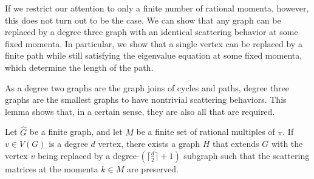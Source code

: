 \documentclass[../thesis-main/thesis-main]{subfiles}
\begin{document}
If we restrict our attention to only a finite number of rational momenta, however, this does not turn out to be the case.  We can show that any graph can be replaced by a degree three graph with an identical scattering behavior at some fixed momenta.  In particular, we show that a single vertex can be replaced by a finite path while still satisfying the eigenvalue equation at some fixed momenta, which determine the length of the path.

As a degree two graphs are the graph joins of cycles and paths, degree three graphs are the smallest graphs to have nontrivial scattering behaviors.  This lemma shows that, in a certain sense, they are also all that are required.


\begin{lemma} Let $\widehat{G}$ be a finite graph, and let $M$ be a finite set of rational multiples of $\pi$.  If $v\in V(G)$ is a degree $d$ vertex, there exists a graph $H$ that extends $G$ with the vertex $v$ being replaced by a degree-$(\lceil \frac{d}{2}\rceil +1)$ subgraph such that the scattering matrices at the momenta $k\in M$ are preserved.
\label{lem:degree_reduction}
\end{lemma}
\end{document}

